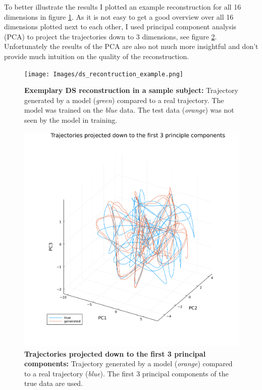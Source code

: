 

To better illustrate the results I plotted an example reconstruction for all 16 dimensions in figure \ref{fig:ds_recontruction_example}. As it is not easy to get a good overview
over all 16 dimensions plotted next to each other, I used principal component analysis (PCA) to project the trajectories down to 3 dimensions, 
see figure \ref{fig:pca_traj_reconstruction}. Unfortunately the results of the PCA are also not much more insightful and don't provide much intuition on the quality of the 
reconstruction.

\begin{figure}
    \texttt{[image: Images/ds\_recontruction\_example.png]}
    \caption[Exemplary DS reconstruction in a sample subject]
    {\textbf{Exemplary DS reconstruction in a sample subject: } Trajectory generated by a model (\textit{green}) compared to a real trajectory. The model was trained on the
    \textit{blue} data. The test data (\textit{orange}) was not seen by the model in training.}
    \label{fig:ds_recontruction_example}
\end{figure}

\begin{figure}
    \includegraphics[width=\textwidth]{Images/pca_traj_reconstruction.png}
    \caption[Trajectories projected down to the first 3 principal components]
    {\textbf{Trajectories projected down to the first 3 principal components: } Trajectory generated by a model (\textit{orange}) compared to a real trajectory (\textit{blue}).
    The first 3 principal components of the true data are used.}
    \label{fig:pca_traj_reconstruction}
\end{figure}


